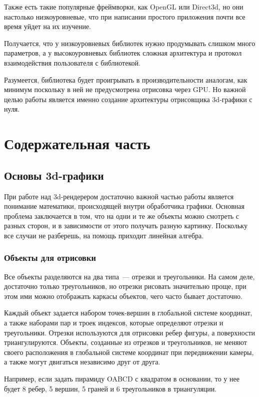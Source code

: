 \documentclass{article}
\begin{document}
Также есть такие популярные фреймворки, как OpenGL или Direct3d, но они настолько низкоуровневые, что при написании простого приложения почти все время уйдет на их изучение.

Получается, что у низкоуровневых библиотек нужно продумывать слишком много параметров, а у высокоуровневых библиотек сложная архитектура и протокол взаимодействия пользователя с библиотекой.

Разумеется, библиотека будет проигрывать в производительности аналогам, как минимум поскольку в ней не предусмотрена отрисовка через GPU. Но важной целью работы является именно создание архитектуры отрисовщика 3d-графики с нуля.

\newpage

\section{Содержательная часть}

\subsection{Основы 3d-графики}

При работе над 3d-рендерером достаточно важной частью работы является понимание математики, происходящей внутри обработчика графики. Основная проблема заключается в том, что на одни и те же объекты можно смотреть с разных сторон, и в зависимости от этого получать разную картинку. Поскольку все случаи не разберешь, на помощь приходит линейная алгебра.

\subsubsection{Объекты для отрисовки}

Все объекты разделяются на два типа~--- отрезки и треугольники. На самом деле, достаточно только треугольников, но отрезки рисовать значительно проще, при этом ими можно отображать каркасы объектов, чего часто бывает достаточно.

Каждый объект задается набором точек-вершин в глобальной системе координат, а также наборами пар и троек индексов, которые определяют отрезки и треугольники. Отрезки используются для отрисовки ребер фигуры, а поверхности триангулируются. Объекты, созданные из отрезков и треугольников, не меняют своего расположения в глобальной системе координат при передвижении камеры, а также могут двигаться независимо друг от друга.

Например, если задать пирамиду OABCD с квадратом в основании, то у нее будет 8 ребер, 5 вершин, 5 граней и 6 треугольников в триангуляции.
\end{document}
